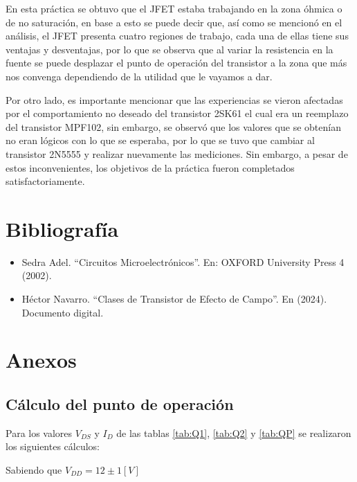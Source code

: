 \documentclass[12pt, a4paper]{article}
\begin{document}
    En esta práctica se obtuvo que el JFET estaba trabajando en la zona óhmica o de no saturación, en base a esto se puede decir que, así como se mencionó en el análisis, el JFET presenta cuatro regiones de trabajo, cada una de ellas tiene sus ventajas y desventajas, por lo que se observa que al variar la resistencia en la fuente se puede desplazar el punto de operación del transistor a la zona que más nos convenga dependiendo de la utilidad que le vayamos a dar. 

    Por otro lado, es importante mencionar que las experiencias se vieron afectadas por el comportamiento no deseado del transistor 2SK61 el cual era un reemplazo del transistor MPF102, sin embargo, se observó que los valores que se obtenían no eran lógicos con lo que se esperaba, por lo que se tuvo que cambiar al transistor 2N5555 y realizar nuevamente las mediciones. Sin embargo, a pesar de estos inconvenientes, los objetivos de la práctica fueron completados satisfactoriamente.

    \newpage

    \section{Bibliografía}

    \begin{itemize}
        \item Sedra Adel. “Circuitos Microelectrónicos”. En: OXFORD University Press 4 (2002).
        \item Héctor Navarro. “Clases de Transistor de Efecto de Campo”. En (2024). Documento digital. 
    \end{itemize}
    
    \printbibliography

    \newpage

    \section{Anexos}

    \subsection{Cálculo del punto de operación}

    Para los valores $V_{DS}$ y $I_D$ de las tablas \ref{tab:Q1}, \ref{tab:Q2} y \ref{tab:QP} se realizaron los siguientes cálculos:

    Sabiendo que $V_{DD} = 12 \pm 1 [V]$
\end{document}
